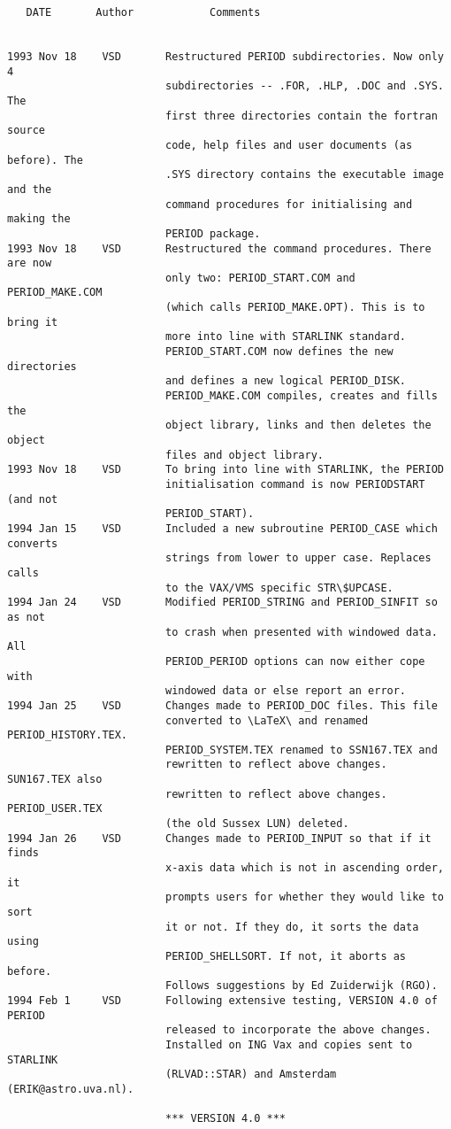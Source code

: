 \begin{verbatim}
   DATE       Author            Comments


1993 Nov 18    VSD       Restructured PERIOD subdirectories. Now only 4
                         subdirectories -- .FOR, .HLP, .DOC and .SYS. The
                         first three directories contain the fortran source
                         code, help files and user documents (as before). The
                         .SYS directory contains the executable image and the
                         command procedures for initialising and making the
                         PERIOD package.
1993 Nov 18    VSD       Restructured the command procedures. There are now
                         only two: PERIOD_START.COM and PERIOD_MAKE.COM
                         (which calls PERIOD_MAKE.OPT). This is to bring it
                         more into line with STARLINK standard.
                         PERIOD_START.COM now defines the new directories
                         and defines a new logical PERIOD_DISK.
                         PERIOD_MAKE.COM compiles, creates and fills the
                         object library, links and then deletes the object
                         files and object library.
1993 Nov 18    VSD       To bring into line with STARLINK, the PERIOD
                         initialisation command is now PERIODSTART (and not
                         PERIOD_START).
1994 Jan 15    VSD       Included a new subroutine PERIOD_CASE which converts
                         strings from lower to upper case. Replaces calls
                         to the VAX/VMS specific STR\$UPCASE.
1994 Jan 24    VSD       Modified PERIOD_STRING and PERIOD_SINFIT so as not
                         to crash when presented with windowed data. All
                         PERIOD_PERIOD options can now either cope with
                         windowed data or else report an error.
1994 Jan 25    VSD       Changes made to PERIOD_DOC files. This file
                         converted to \LaTeX\ and renamed PERIOD_HISTORY.TEX.
                         PERIOD_SYSTEM.TEX renamed to SSN167.TEX and
                         rewritten to reflect above changes. SUN167.TEX also
                         rewritten to reflect above changes. PERIOD_USER.TEX
                         (the old Sussex LUN) deleted.
1994 Jan 26    VSD       Changes made to PERIOD_INPUT so that if it finds
                         x-axis data which is not in ascending order, it
                         prompts users for whether they would like to sort
                         it or not. If they do, it sorts the data using
                         PERIOD_SHELLSORT. If not, it aborts as before.
                         Follows suggestions by Ed Zuiderwijk (RGO).
1994 Feb 1     VSD       Following extensive testing, VERSION 4.0 of PERIOD
                         released to incorporate the above changes.
                         Installed on ING Vax and copies sent to STARLINK
                         (RLVAD::STAR) and Amsterdam (ERIK@astro.uva.nl).

                         *** VERSION 4.0 ***

\end{verbatim}


